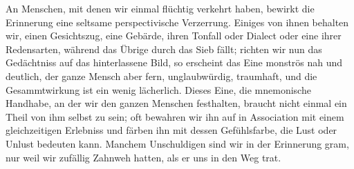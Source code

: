 An Menschen, mit denen wir einmal flüchtig verkehrt haben, bewirkt die Erinnerung eine seltsame perspectivische Verzerrung. Einiges von ihnen behalten wir, einen Gesichtszug, eine Gebärde, ihren Tonfall oder Dialect oder eine ihrer Redensarten, während das Übrige durch das Sieb fällt; richten wir nun das Gedächtniss auf das hinterlassene Bild, so erscheint das Eine monströs nah und deutlich, der ganze Mensch aber fern, unglaubwürdig, traumhaft, und die Gesammtwirkung ist ein wenig lächerlich. Dieses Eine, die mnemonische Handhabe, an der wir den ganzen Menschen festhalten, braucht nicht einmal ein Theil von ihm selbst zu sein; oft bewahren wir ihn auf in Association mit einem gleichzeitigen Erlebniss und färben ihn mit dessen Gefühlsfarbe, die Lust oder Unlust bedeuten kann. Manchem Unschuldigen sind wir in der Erinnerung gram, nur weil wir zufällig Zahnweh hatten, als er uns in den Weg trat.
\par

